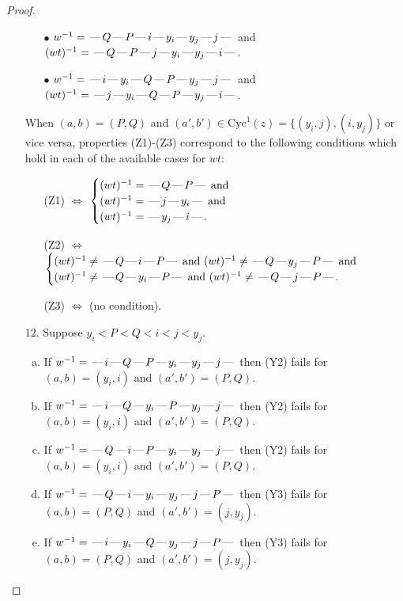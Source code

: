 \documentclass[10pt]{article}
\theoremstyle{definition}
\theoremstyle{definition}
\def\dash{\text{\hspace{0.5mm}---\hspace{0.5mm}}}
\def\Cyc{\mathrm{Cyc}}
\begin{document}
\begin{proof}
\begin{enumerate}
\begin{enumerate}
\item[$\bullet$] $w^{-1} = \dash Q\dash P\dash i\dash y_i\dash y_j\dash j\dash $ and $(wt)^{-1} = \dash Q\dash P\dash j\dash y_i\dash y_j\dash i\dash $.
\item[$\bullet$] $w^{-1} = \dash i\dash y_i\dash Q\dash P\dash y_j\dash j\dash $ and $(wt)^{-1} = \dash j\dash y_i\dash Q\dash P\dash y_j\dash i\dash $.
\end{enumerate}
When $(a,b)= (P,Q)$ and $(a',b')\in \Cyc^1(z)=\{(y_i,j),(i,y_j)\}$ or vice versa,
properties (Z1)-(Z3) correspond to the following conditions which
hold in each of the available cases for $wt$:
\begin{enumerate}
\item[](Z1) $\Leftrightarrow$ $\begin{cases}\text{$(wt)^{-1} = \dash Q \dash P \dash$}\text{ and }\\
\text{$(wt)^{-1} = \dash j \dash y_i \dash$}\text{ and }\\
\text{$(wt)^{-1} = \dash y_j \dash i \dash$}.\end{cases}$
\item[](Z2) $\Leftrightarrow$ $\begin{cases}\text{$(wt)^{-1} \neq \dash Q \dash i \dash P \dash$ and $(wt)^{-1}\neq \dash Q \dash y_j \dash P \dash$}\text{ and }\\
\text{$(wt)^{-1} \neq \dash Q \dash y_i \dash P \dash$ and $(wt)^{-1}\neq \dash Q \dash j \dash P \dash$}.\end{cases}$
\item[](Z3) $\Leftrightarrow$ (no condition).
\end{enumerate}
\item[$12$.] Suppose $y_i < P < Q < i < j < y_j$.
\begin{enumerate}[(a)]
\item If $w^{-1} = \dash i\dash Q\dash P\dash y_i\dash y_j\dash j\dash $ then (Y2) fails for $(a,b)=(y_i,i)$ and $(a',b')=(P,Q)$.
\item If $w^{-1} = \dash i\dash Q\dash y_i\dash P\dash y_j\dash j\dash $ then (Y2) fails for $(a,b)=(y_i,i)$ and $(a',b')=(P,Q)$.
\item If $w^{-1} = \dash Q\dash i\dash P\dash y_i\dash y_j\dash j\dash $ then (Y2) fails for $(a,b)=(y_i,i)$ and $(a',b')=(P,Q)$.
\item If $w^{-1} = \dash Q\dash i\dash y_i\dash y_j\dash j\dash P\dash $ then (Y3) fails for $(a,b)=(P,Q)$ and $(a',b')=(j,y_j)$.
\item If $w^{-1} = \dash i\dash y_i\dash Q\dash y_j\dash j\dash P\dash $ then (Y3) fails for $(a,b)=(P,Q)$ and $(a',b')=(j,y_j)$.

\end{enumerate}
\end{enumerate}
\end{proof}
\end{document}
